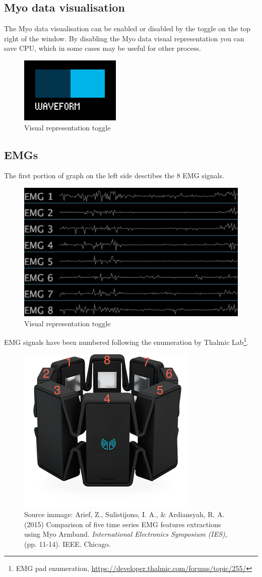 \documentclass[12pt,a4paper]{article}
\begin{document}
		\subsection{Myo data visualisation}
		The Myo data visualisation can be enabled or disabled by the toggle on the top right of the window. By disabling the Myo data visual representation you can save CPU, which in some cases may be useful for other process.
		
			\begin{figure}[h]
				\centering
				\includegraphics[width=0.1\linewidth]{../MyoMapper-Waveform}
				\caption{Visual representation toggle}
				\label{fig:MyoMapper-Waveform}
			\end{figure}

		\subsection{EMGs}
		The first portion of graph on the left side desctibes the 8 EMG signals.
		
			\begin{figure}[h]
				\centering
				\includegraphics[width=0.6\linewidth]{../MyoMapper-EMG}
				\caption{Visual representation toggle}
				\label{fig:MyoMapper-EMG}
			\end{figure}
		
		EMG signals have been numbered following the enumeration by Thalmic Lab\footnote{EMG pad enumeration, \url{https://developer.thalmic.com/forums/topic/255/}}.
		
		\begin{figure}[h]
			\centering
			\includegraphics[width=0.4\linewidth]{../EMG-myo-pad-enumeration}
		    \caption{Source immage: Arief, Z., Sulistijono, I. A., \& Ardiansyah, R. A. (2015) Comparison of five time series EMG features extractions using Myo Armband. \textit{International Electronics Symposium (IES)},  (pp. 11-14). IEEE. Chicago.}
			\label{fig:EMG-myo-pad-enumeration}
		\end{figure}
		
\end{document}
